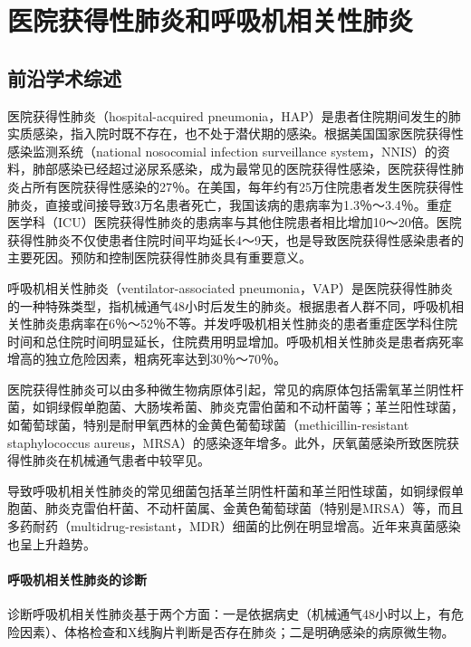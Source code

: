 \chapter{医院获得性肺炎和呼吸机相关性肺炎}

\section{前沿学术综述}

医院获得性肺炎（hospital-acquired
pneumonia，HAP）是患者住院期间发生的肺实质感染，指入院时既不存在，也不处于潜伏期的感染。根据美国国家医院获得性感染监测系统（national
nosocomial infection surveillance
system，NNIS）的资料，肺部感染已经超过泌尿系感染，成为最常见的医院获得性感染，医院获得性肺炎占所有医院获得性感染的27％。在美国，每年约有25万住院患者发生医院获得性肺炎，直接或间接导致3万名患者死亡，我国该病的患病率为1.3％～3.4％。重症医学科（ICU）医院获得性肺炎的患病率与其他住院患者相比增加10～20倍。医院获得性肺炎不仅使患者住院时间平均延长4～9天，也是导致医院获得性感染患者的主要死因。预防和控制医院获得性肺炎具有重要意义。

呼吸机相关性肺炎（ventilator-associated
pneumonia，VAP）是医院获得性肺炎的一种特殊类型，指机械通气48小时后发生的肺炎。根据患者人群不同，呼吸机相关性肺炎患病率在6％～52％不等。并发呼吸机相关性肺炎的患者重症医学科住院时间和总住院时间明显延长，住院费用明显增加。呼吸机相关性肺炎是患者病死率增高的独立危险因素，粗病死率达到30％～70％。

医院获得性肺炎可以由多种微生物病原体引起，常见的病原体包括需氧革兰阴性杆菌，如铜绿假单胞菌、大肠埃希菌、肺炎克雷伯菌和不动杆菌等；革兰阳性球菌，如葡萄球菌，特别是耐甲氧西林的金黄色葡萄球菌（methicillin-resistant
staphylococcus
aureus，MRSA）的感染逐年增多。此外，厌氧菌感染所致医院获得性肺炎在机械通气患者中较罕见。

导致呼吸机相关性肺炎的常见细菌包括革兰阴性杆菌和革兰阳性球菌，如铜绿假单胞菌、肺炎克雷伯杆菌、不动杆菌属、金黄色葡萄球菌（特别是MRSA）等，而且多药耐药（multidrug-resistant，MDR）细菌的比例在明显增高。近年来真菌感染也呈上升趋势。

\subsubsection{呼吸机相关性肺炎的诊断}

诊断呼吸机相关性肺炎基于两个方面：一是依据病史（机械通气48小时以上，有危险因素）、体格检查和X线胸片判断是否存在肺炎；二是明确感染的病原微生物。


